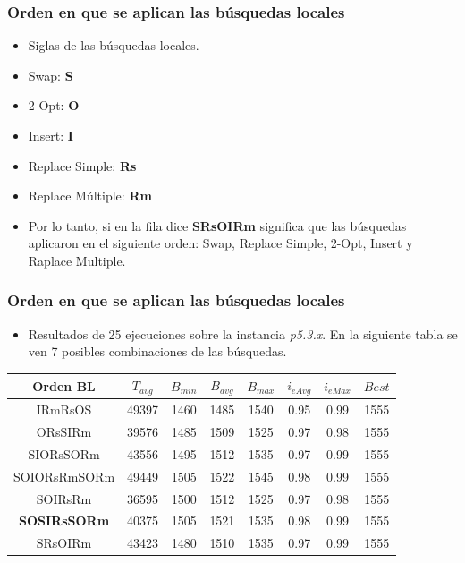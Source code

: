 \documentclass{beamer}
\begin{document}

\begin{frame}
\frametitle{Orden en que se aplican las búsquedas locales}

\begin{itemize}
    \item Siglas de las búsquedas locales.
    \pause
    \item Swap: \textbf{S}
    \pause
    \item 2-Opt: \textbf{O}
    \pause
    \item Insert: \textbf{I}
    \pause
    \item Replace Simple: \textbf{Rs}
    \pause
    \item Replace Múltiple: \textbf{Rm}
    \pause
    \item Por lo tanto, si en la fila dice \textbf{SRsOIRm} significa que las búsquedas aplicaron en el siguiente orden: Swap, Replace Simple, 2-Opt, Insert y Raplace Multiple.    
\end{itemize}

\end{frame}


\begin{frame}
\frametitle{Orden en que se aplican las búsquedas locales}

\begin{itemize}
    \item Resultados de 25 ejecuciones sobre la instancia \textit{p5.3.x}. En la siguiente tabla se ven 7 posibles combinaciones de las búsquedas.
\end{itemize}

\begin{table}
\begin{center}
\begin{tabular}{ |c|c|c|c|c|c|c|c| } 
\hline
Orden BL & $T_{avg}$ & $B_{min}$ & $B_{avg}$ & $B_{max}$ & $i_{eAvg}$ & $i_{eMax}$ & $Best$ \\
\hline
IRmRsOS & 49397 & 1460 & 1485 & 1540 & 0.95 & 0.99 & 1555  \\
ORsSIRm & 39576 & 1485 & 1509 & 1525 & 0.97 & 0.98 & 1555  \\
SIORsSORm & 43556 & 1495 & 1512 & 1535 & 0.97 & 0.99 & 1555  \\
SOIORsRmSORm & 49449 & 1505 & 1522 & 1545 & 0.98 & 0.99 & 1555  \\
SOIRsRm & 36595 & 1500 & 1512 & 1525 & 0.97 & 0.98 & 1555  \\
\textbf{SOSIRsSORm} & 40375 & 1505 & 1521 & 1535 & 0.98 & 0.99 & 1555  \\
SRsOIRm & 43423 & 1480 & 1510 & 1535 & 0.97 & 0.99 & 1555  \\
\hline
\end{tabular}
\end{center}
\label{tab:resultadosListaLS1}
\end{table}

\end{frame}
\end{document}
